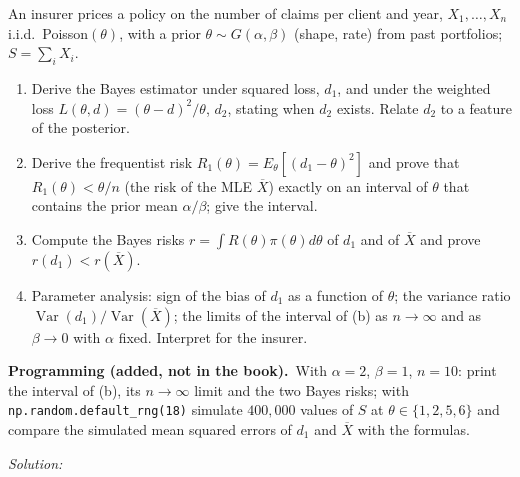 \documentclass[11pt,a4paper]{article}
\newif\ifsolucoes
\newcommand{\espacoresol}{4.5cm}   %
\numberwithin{equation}{questao}   %
\newcommand{\programacao}{\par\smallskip\noindent\textbf{Programming (added, not in the book).}~}
\newcommand{\resolespaco}{\ifsolucoes\else\par\textit{Solution:}\vspace{\espacoresol}\par\fi}
\newcommand{\Var}{\operatorname{Var}}
\newcommand{\1}{\mathbf{1}}
\begin{document}
An insurer prices a policy on the number of claims per client and year, $X_1,\dots,X_n$ i.i.d.\
Poisson$(\theta)$, with a prior $\theta\sim G(\alpha,\beta)$ (shape, rate) from past portfolios;
$S=\sum_iX_i$.
\begin{enumerate}[label=\textbf{(\alph*)},leftmargin=2.4em]
\item Derive the Bayes estimator under squared loss, $d_1$, and under the weighted loss
$L(\theta,d)=(\theta-d)^2/\theta$, $d_2$, stating when $d_2$ exists. Relate $d_2$ to a feature of the
posterior.
\item Derive the frequentist risk $R_1(\theta)=E_\theta[(d_1-\theta)^2]$ and prove that
$R_1(\theta)<\theta/n$ (the risk of the MLE $\overline X$) exactly on an interval of $\theta$ that
contains the prior mean $\alpha/\beta$; give the interval.
\item Compute the Bayes risks $r=\int R(\theta)\pi(\theta)d\theta$ of $d_1$ and of $\overline X$ and prove
$r(d_1)<r(\overline X)$.
\item Parameter analysis: sign of the bias of $d_1$ as a function of $\theta$; the variance ratio
$\Var(d_1)/\Var(\overline X)$; the limits of the interval of (b) as $n\to\infty$ and as $\beta\to0$
with $\alpha$ fixed. Interpret for the insurer.
\end{enumerate}
\programacao With $\alpha=2$, $\beta=1$, $n=10$: print the interval of (b), its $n\to\infty$ limit and
the two Bayes risks; with \texttt{np.random.default\_rng(18)} simulate $400{,}000$ values of $S$ at
$\theta\in\{1,2,5,6\}$ and compare the simulated mean squared errors of $d_1$ and $\overline X$ with
the formulas.
\resolespaco
\end{document}
